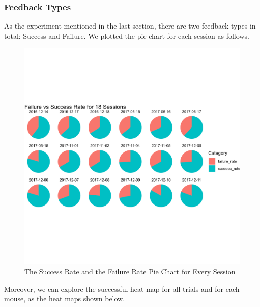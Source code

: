\documentclass{article}
\begin{document}
	\subsubsection{Feedback Types}
	\par As the experiment mentioned in the last section, there are two feedback types in total: Success and Failure. We plotted the pie chart for each session as follows.
	\begin{figure}[htbp]
		\centering
		\includegraphics[scale = 0.5]{Pics/006}
		\caption{The Success Rate and the Failure Rate Pie Chart for Every Session}
		\label{fig:006}
	\end{figure}
	\par Moreover, we can explore the successful heat map for all trials and for each mouse, as the heat maps shown below.
\end{document}
